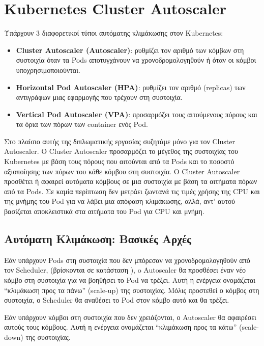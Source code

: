 \section{Kubernetes Cluster Autoscaler}

Υπάρχουν 3 διαφορετικοί τύποι αυτόματης κλιμάκωσης στον Kubernetes:
\begin{itemize}
      \tightlist
      \item \textbf{Cluster Autoscaler (Autoscaler)}: ρυθμίζει τον αριθμό των
            κόμβων στη συστοιχία όταν τα Pods αποτυγχάνουν να χρονοδρομολογηθούν
            ή όταν οι κόμβοι υποχρησιμοποιούνται.
      \item \textbf{Horizontal Pod Autoscaler (HPA)}: ρυθμίζει τον αριθμό
            (replicas) των αντιγράφων μιας εφαρμογής που τρέχουν στη συστοιχία.
      \item \textbf{Vertical Pod Autoscaler (VPA)}: προσαρμόζει τους αιτούμενους
            πόρους και τα όρια των πόρων των container ενός Pod.
\end{itemize}

Στο πλαίσιο αυτής της διπλωματικής εργασίας συζητάμε μόνο για τον Cluster
Autoscaler. Ο Cluster Autoscaler προσαρμόζει το μέγεθος της συστοιχίας του
Kubernetes με βάση τους πόρους που αιτούνται από τα Pods και το ποσοστό
αξιοποίησης των πόρων του κάθε κόμβου στη συστοιχία. Ο Cluster Autoscaler
προσθέτει ή αφαιρεί αυτόματα κόμβους σε μια συστοιχία με βάση τα αιτήματα πόρων
από τα Pods. Σε καμία περίπτωση δεν μετράει ζωντανά τις τιμές χρήσης της CPU και
της μνήμης του Pod για να λάβει μια απόφαση κλιμάκωσης, αλλά, αντ' αυτού
βασίζεται αποκλειστικά στα αιτήματα του Pod για CPU και μνήμη.

\subsection{Αυτόματη Κλιμάκωση: Βασικές Αρχές}

Εάν υπάρχουν Pods στη συστοιχία που δεν μπόρεσαν να χρονοδρομολογηθούν από τον
Scheduler, (βρίσκονται σε κατάσταση ), o Autoscaler θα προσθέσει
έναν νέο κόμβο στη συστοιχία για να βοηθήσει το Pod να τρέξει. Αυτή η ενέργεια
ονομάζεται ``κλιμάκωση προς τα πάνω'' (scale-up) της συστοιχίας. Μόλις προστεθεί
ο κόμβος στη συστοιχία, ο Scheduler θα  αναθέσει το Pod στον κόμβο αυτό και θα
τρέξει.

Εάν υπάρχουν κόμβοι στη συστοιχία που δεν χρειάζονται, ο Autoscaler θα αφαιρέσει
αυτούς τους κόμβους. Αυτή η ενέργεια ονομάζεται ``κλιμάκωση προς τα κάτω''
(scale-down) της συστοιχίας.

